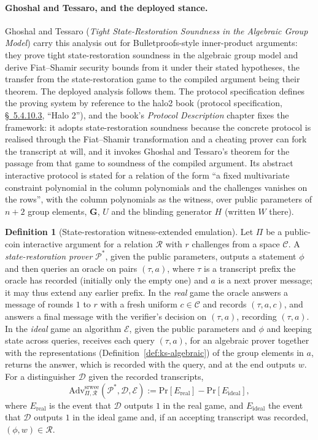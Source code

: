 \documentclass[11pt,a4paper]{article}
\theoremstyle{definition}
\newtheorem{definition}[theorem]{Definition}
\renewcommand{\Pr}{\mathrm{Pr}}
\newcommand{\Prov}{\mathcal{P}}
\newcommand{\Ext}{\mathcal{E}}
\newcommand{\Rel}{\mathcal{R}}
\begin{document}
\paragraph{Ghoshal and Tessaro, and the deployed stance.}
Ghoshal and Tessaro (\emph{Tight State-Restoration Soundness in the
Algebraic Group Model}) carry this analysis out for
Bulletproofs-style inner-product arguments: they prove tight
state-restoration soundness in the algebraic group model and derive
Fiat--Shamir security bounds from it under their stated hypotheses, the
transfer from the state-restoration game to the compiled argument being
their theorem. The deployed analysis follows them. The protocol
specification defines the proving system by reference to the halo2 book
(protocol specification,
\href{https://zips.z.cash/protocol/protocol.pdf\#halo2}{\S~5.4.10.3},
``Halo 2''), and the book's \emph{Protocol Description} chapter fixes
the framework: it adopts state-restoration soundness because the
concrete protocol is realised through the Fiat--Shamir transformation
and a cheating prover can fork the transcript at will, and it invokes
Ghoshal and Tessaro's theorem for the passage from that game to
soundness of the compiled argument. Its abstract interactive protocol is
stated for a relation of the form ``a fixed multivariate constraint
polynomial in the column polynomials and the challenges vanishes on the
rows'', with the column polynomials as the witness, over public
parameters of $n + 2$ group elements, $\mathbf G$, $U$ and the blinding
generator $H$ (written $W$ there).

\begin{definition}[State-restoration witness-extended emulation]
\label{def:ks-srwee}
Let $\Pi$ be a public-coin interactive argument for a relation $\Rel$
with $r$ challenges from a space $\mathcal C$. A
\emph{state-restoration prover} $\Prov^{*}$, given the public
parameters, outputs a statement $\phi$ and then queries an oracle on
pairs $(\tau, a)$, where $\tau$ is a transcript prefix the oracle has
recorded (initially only the empty one) and $a$ is a next prover
message; it may thus extend any earlier prefix. In the \emph{real} game
the oracle answers a message of rounds $1$ to $r$ with a fresh uniform
$c \in \mathcal C$ and records $(\tau, a, c)$, and answers a final
message with the verifier's decision on $(\tau, a)$, recording
$(\tau, a)$. In the \emph{ideal} game an algorithm $\Ext$, given the
public parameters and $\phi$ and keeping state across queries, receives
each query $(\tau, a)$, for an algebraic prover together with the
representations (Definition~\ref{def:ks-algebraic}) of the group
elements in $a$, returns the answer, which is recorded with the query,
and at the end outputs $w$. For a distinguisher
$\mathcal D$ given the recorded transcripts,
\[
\mathrm{Adv}^{\mathrm{srwee}}_{\Pi, \Rel}(\Prov^{*}, \mathcal D, \Ext)
:= \Pr[E_{\mathrm{real}}] - \Pr[E_{\mathrm{ideal}}],
\]
where $E_{\mathrm{real}}$ is the event that $\mathcal D$ outputs $1$ in
the real game, and $E_{\mathrm{ideal}}$ the event that $\mathcal D$
outputs $1$ in the ideal game and, if an accepting transcript was
recorded, $(\phi, w) \in \Rel$.
\end{definition}
\end{document}
